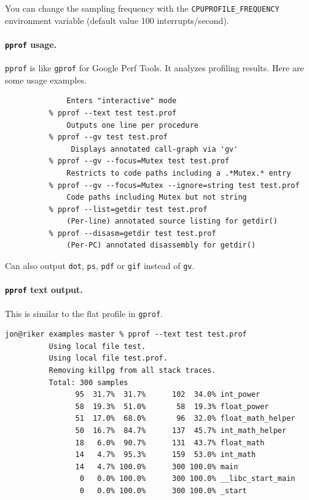 You can change the sampling frequency with the {\tt CPUPROFILE\_FREQUENCY} environment variable
(default value 100 interrupts/second).

\paragraph{{\tt pprof} usage.} {\tt pprof} is like {\tt gprof} for Google Perf Tools. It
analyzes profiling results. Here are some usage examples.
  \begin{lstlisting}[basicstyle=\scriptsize]
          % pprof test test.prof
              Enters "interactive" mode
          % pprof --text test test.prof
              Outputs one line per procedure
          % pprof --gv test test.prof
               Displays annotated call-graph via 'gv'
          % pprof --gv --focus=Mutex test test.prof
              Restricts to code paths including a .*Mutex.* entry
          % pprof --gv --focus=Mutex --ignore=string test test.prof
              Code paths including Mutex but not string
          % pprof --list=getdir test test.prof
              (Per-line) annotated source listing for getdir()
          % pprof --disasm=getdir test test.prof
              (Per-PC) annotated disassembly for getdir()
  \end{lstlisting}

Can also output {\tt dot}, {\tt ps}, {\tt pdf} or {\tt gif} instead of {\tt gv}.

\paragraph{{\tt pprof} text output.}
This is similar to the flat profile in {\tt gprof}.

  \begin{lstlisting}[basicstyle=\scriptsize]
          jon@riker examples master % pprof --text test test.prof 
          Using local file test.
          Using local file test.prof.
          Removing killpg from all stack traces.
          Total: 300 samples
                95  31.7%  31.7%      102  34.0% int_power
                58  19.3%  51.0%       58  19.3% float_power
                51  17.0%  68.0%       96  32.0% float_math_helper
                50  16.7%  84.7%      137  45.7% int_math_helper
                18   6.0%  90.7%      131  43.7% float_math
                14   4.7%  95.3%      159  53.0% int_math
                14   4.7% 100.0%      300 100.0% main
                 0   0.0% 100.0%      300 100.0% __libc_start_main
                 0   0.0% 100.0%      300 100.0% _start
  \end{lstlisting}

